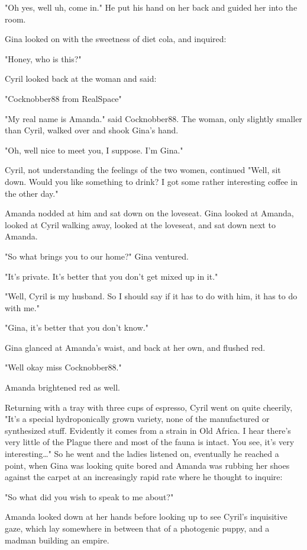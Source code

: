 \documentclass[12pt]{article}
\begin{document}
"Oh yes, well uh, come in." He put his hand on her back and guided her into the room.

Gina looked on with the sweetness of diet cola, and inquired:

"Honey, who is this?"

Cyril looked back at the woman and said:

"Cocknobber88 from RealSpace"

"My real name is Amanda." said Cocknobber88. The woman, only slightly smaller than Cyril, walked over and shook Gina's hand.

"Oh, well nice to meet you, I suppose. I'm Gina."

Cyril, not understanding the feelings of the two women, continued "Well, sit down. Would you like something to drink? I got some rather interesting coffee in the other day." 

Amanda nodded at him and sat down on the loveseat. Gina looked at Amanda, looked at Cyril walking away, looked at the loveseat, and sat down next to Amanda.

"So what brings you to our home?" Gina ventured.

"It's private. It's better that you don't get mixed up in it."

"Well, Cyril is my husband. So I should say if it has to do with him, it has to do with me."

"Gina, it's better that you don't know."

Gina glanced at Amanda's waist, and back at her own, and flushed red.

"Well okay miss Cocknobber88."

Amanda brightened red as well.

Returning with a tray with three cups of espresso, Cyril went on quite cheerily, "It's a special hydroponically grown variety, none of the manufactured or synthesized stuff. Evidently it comes from a strain in Old Africa. I hear there's very little of the Plague there and most of the fauna is intact. You see, it's very interesting\ldots{}" So he went and the ladies listened on, eventually he reached a point, when Gina was looking quite bored and Amanda was rubbing her shoes against the carpet at an increasingly rapid rate where he thought to inquire:

"So what did you wish to speak to me about?"

Amanda looked down at her hands before looking up to see Cyril's inquisitive gaze, which lay somewhere in between that of a photogenic puppy, and a madman building an empire.
\end{document}
